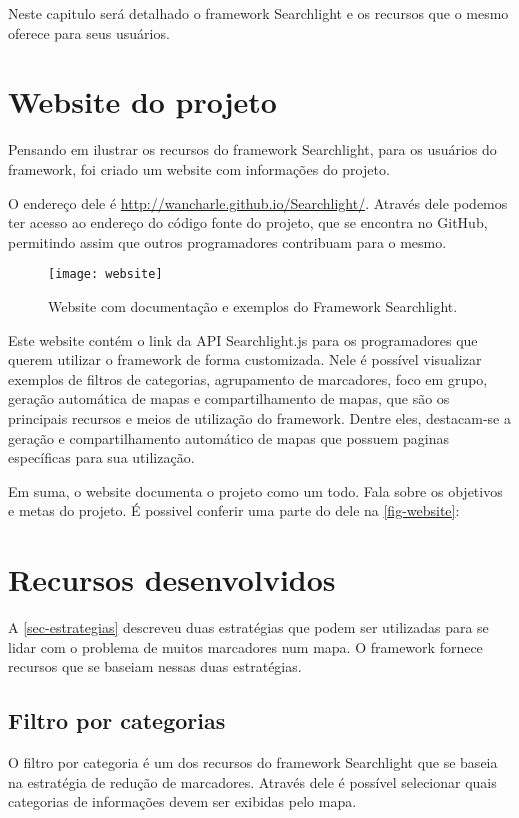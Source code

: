 Neste capitulo será detalhado o framework Searchlight e os recursos que o mesmo oferece para seus usuários.

\section{Website do projeto}
Pensando em ilustrar os recursos do framework Searchlight, para os usuários do framework, foi criado um website com informações do projeto.

O endereço dele é \url{http://wancharle.github.io/Searchlight/}. Através dele podemos ter acesso ao endereço do código fonte do projeto, que se encontra no GitHub, permitindo assim que outros programadores contribuam para o mesmo.

\begin{figure}[htb]
	\caption{\label{fig-website}Website com documentação e exemplos do Framework Searchlight.}
	\begin{center}
	    \texttt{[image: website]}
	\end{center}
\end{figure}


Este website contém o link da API Searchlight.js para os programadores que querem utilizar o framework de forma customizada. Nele é possível visualizar exemplos de filtros de categorias, agrupamento de marcadores, foco em grupo, geração automática de mapas e compartilhamento de mapas, que são os principais recursos e meios de utilização do framework. Dentre eles, destacam-se a geração e compartilhamento automático de mapas que possuem paginas específicas para sua utilização. 


Em suma, o website documenta o projeto como um todo. Fala sobre os objetivos e metas do projeto. É possivel conferir uma parte do dele na \autoref{fig-website}: 

\section{Recursos desenvolvidos}
A \autoref{sec-estrategias} descreveu duas estratégias que podem ser utilizadas para se lidar com o problema de muitos marcadores num mapa. O framework fornece recursos que se baseiam nessas duas estratégias. 

\subsection{Filtro por categorias}
O filtro por categoria é um dos recursos do framework Searchlight que se baseia na estratégia de redução de marcadores. Através dele é possível selecionar quais categorias de informações devem ser exibidas pelo mapa. 

